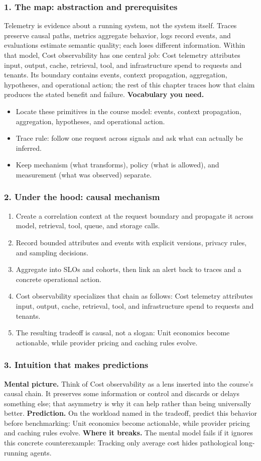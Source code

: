 \subsubsection*{1. The map: abstraction and prerequisites}
Telemetry is evidence about a running system, not the system itself. Traces preserve causal paths, metrics aggregate behavior, logs record events, and evaluations estimate semantic quality; each loses different information.
Within that model, Cost observability has one central job: Cost telemetry attributes input, output, cache, retrieval, tool, and infrastructure spend to requests and tenants. Its boundary contains events, context propagation, aggregation, hypotheses, and operational action; the rest of this chapter traces how that claim produces the stated benefit and failure.
\textbf{Vocabulary you need.}\begin{itemize}
\item Locate these primitives in the course model: events, context propagation, aggregation, hypotheses, and operational action.
\item Trace rule: follow one request across signals and ask what can actually be inferred.
\item Keep mechanism (what transforms), policy (what is allowed), and measurement (what was observed) separate.
\end{itemize}
\subsubsection*{2. Under the hood: causal mechanism}\begin{enumerate}
\item Create a correlation context at the request boundary and propagate it across model, retrieval, tool, queue, and storage calls.
\item Record bounded attributes and events with explicit versions, privacy rules, and sampling decisions.
\item Aggregate into SLOs and cohorts, then link an alert back to traces and a concrete operational action.
\item Cost observability specializes that chain as follows: Cost telemetry attributes input, output, cache, retrieval, tool, and infrastructure spend to requests and tenants.
\item The resulting tradeoff is causal, not a slogan: Unit economics become actionable, while provider pricing and caching rules evolve.
\end{enumerate}
\subsubsection*{3. Intuition that makes predictions}
\textbf{Mental picture.} Think of Cost observability as a lens inserted into the course's causal chain. It preserves some information or control and discards or delays something else; that asymmetry is why it can help rather than being universally better.
\textbf{Prediction.} On the workload named in the tradeoff, predict this behavior before benchmarking: Unit economics become actionable, while provider pricing and caching rules evolve.
\textbf{Where it breaks.} The mental model fails if it ignores this concrete counterexample: Tracking only average cost hides pathological long-running agents.
